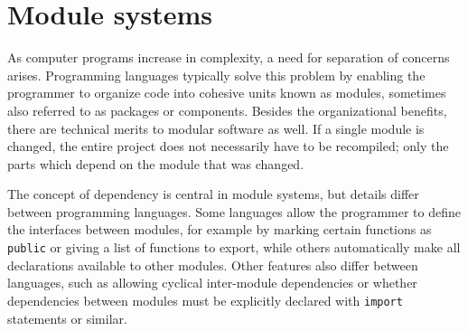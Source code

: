 \section{Module systems}

As computer programs increase in complexity, a need for separation of concerns arises. Programming languages typically solve this problem by enabling the programmer to organize code into cohesive units known as modules, sometimes also referred to as packages or components. Besides the organizational benefits, there are technical merits to modular software as well. If a single module is changed, the entire project does not necessarily have to be recompiled; only the parts which depend on the module that was changed.

The concept of dependency is central in module systems, but details differ between programming languages. Some languages allow the programmer to define the interfaces between modules, for example by marking certain functions as \texttt{public} or giving a list of functions to export, while others automatically make all declarations available to other modules. Other features also differ between languages, such as allowing cyclical inter-module dependencies or whether dependencies between modules must be explicitly declared with \texttt{import} statements or similar.